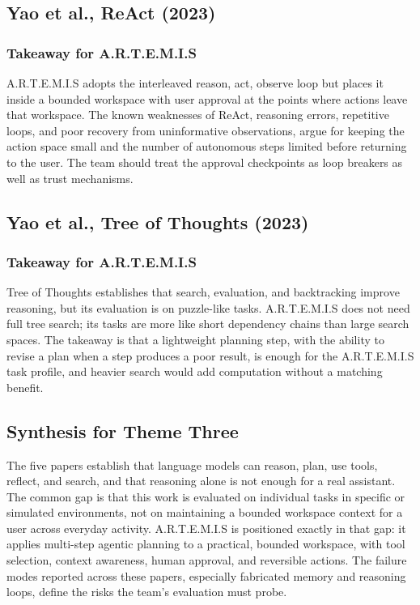 \documentclass[11pt,a4paper]{report}
\newcommand{\artemis}{A.R.T.E.M.I.S}
\begin{document}
\subsection{Yao et al., ReAct (2023)}

\subsubsection{Takeaway for \artemis{}}

\artemis{} adopts the interleaved reason, act, observe loop but places
it inside a bounded workspace with user approval at the points where
actions leave that workspace. The known weaknesses of ReAct, reasoning
errors, repetitive loops, and poor recovery from uninformative
observations, argue for keeping the action space small and the number
of autonomous steps limited before returning to the user. The team
should treat the approval checkpoints as loop breakers as well as trust
mechanisms.

\subsection{Yao et al., Tree of Thoughts (2023)}

\subsubsection{Takeaway for \artemis{}}

Tree of Thoughts establishes that search, evaluation, and backtracking
improve reasoning, but its evaluation is on puzzle-like tasks. \artemis{}
does not need full tree search; its tasks are more like short
dependency chains than large search spaces. The takeaway is that a
lightweight planning step, with the ability to revise a plan when a
step produces a poor result, is enough for the \artemis{} task profile,
and heavier search would add computation without a matching benefit.

\subsection{Synthesis for Theme Three}

The five papers establish that language models can reason, plan, use
tools, reflect, and search, and that reasoning alone is not enough for a
real assistant. The common gap is that this work is evaluated on
individual tasks in specific or simulated environments, not on
maintaining a bounded workspace context for a user across everyday
activity. \artemis{} is positioned exactly in that gap: it applies
multi-step agentic planning to a practical, bounded workspace, with
tool selection, context awareness, human approval, and reversible
actions. The failure modes reported across these papers, especially
fabricated memory and reasoning loops, define the risks the team's
evaluation must probe.
\end{document}

